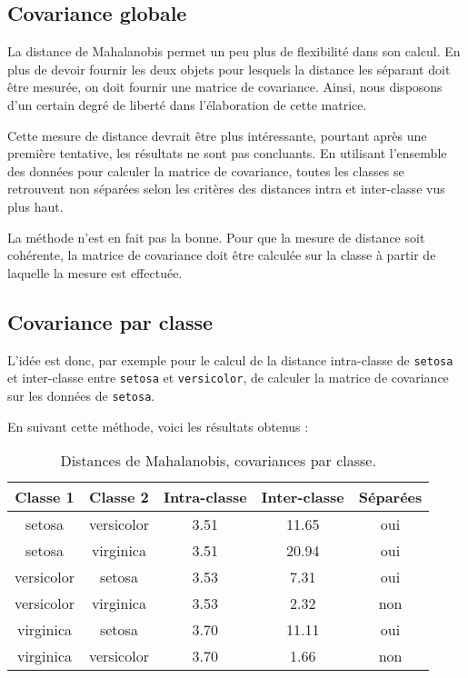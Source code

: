\documentclass[french]{report}
\begin{document}
    \subsection{Covariance globale}
    
    La distance de Mahalanobis permet un peu plus de flexibilité dans son calcul.
    En plus de devoir fournir les deux objets pour lesquels la distance les séparant doit être mesurée, on doit fournir une matrice de covariance.
    Ainsi, nous disposons d'un certain degré de liberté dans l'élaboration de cette matrice.
    
    Cette mesure de distance devrait être plus intéressante, pourtant après une première tentative, les résultats ne sont pas concluants.
    En utilisant l'ensemble des données pour calculer la matrice de covariance, toutes les classes se retrouvent non séparées selon les critères des distances intra et inter-classe vus plus haut.
    
    La méthode n'est en fait pas la bonne.
    Pour que la mesure de distance soit cohérente, la matrice de covariance doit être calculée sur la classe à partir de laquelle la mesure est effectuée.
    
    \subsection{Covariance par classe}
    
    L'idée est donc, par exemple pour le calcul de la distance intra-classe de \texttt{setosa} et inter-classe entre \texttt{setosa} et \texttt{versicolor}, de calculer la matrice de covariance sur les données de \texttt{setosa}.
    
    En suivant cette méthode, voici les résultats obtenus :
    
    \begin{table}[h]
        \centering
        \begin{tabular}{||c c c c c||}
            \hline
            \textbf{Classe 1} & \textbf{Classe 2} & \textbf{Intra-classe} & \textbf{Inter-classe} & \textbf{Séparées} \\
            \hline\hline
            setosa & versicolor & 3.51 & 11.65 & {\color{ForestGreen}oui} \\
            setosa & virginica & 3.51 & 20.94 & {\color{ForestGreen}oui} \\
            \hline
            versicolor & setosa & 3.53 & 7.31 & {\color{ForestGreen}oui} \\
            versicolor & virginica & 3.53 & 2.32 & {\color{BrickRed}non} \\
            \hline
            virginica & setosa & 3.70 & 11.11 & {\color{ForestGreen}oui} \\
            virginica & versicolor & 3.70 & 1.66 & {\color{BrickRed}non} \\
            \hline
        \end{tabular}
        \caption{Distances de Mahalanobis, covariances par classe.}
    \end{table}
    \leavevmode
    
\end{document}
